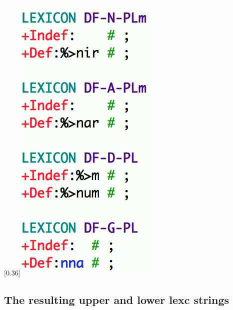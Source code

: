 \documentclass{article}
\begin{document}
\scalebox{0.36}[0.36]{\includegraphics{img/dfnplm.png}} \\\subsection{The resulting upper and lower lexc strings} 
\end{document}
